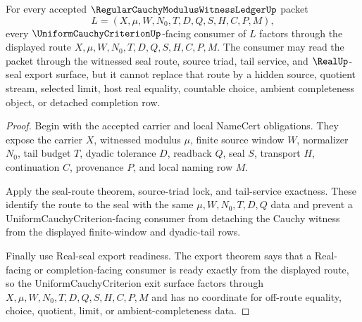\begin{theorem}
\label{thm:regular-cauchy-modulus-witness-ledger-uniform-exit-factor}
For every accepted $\RegularCauchyModulusWitnessLedgerUp$ packet
$$
L=(X,\mu,W,N_0,T,D,Q,S,H,C,P,M),
$$
every $\UniformCauchyCriterionUp$-facing consumer of $L$ factors through the displayed route $X,\mu,W,N_0,T,D,Q,S,H,C,P,M$. The consumer may read the packet through the witnessed seal route, source triad, tail service, and $\RealUp$-seal export surface, but it cannot replace that route by a hidden source, quotient stream, selected limit, host real equality, countable choice, ambient completeness object, or detached completion row.
\end{theorem}
\begin{proof}
Begin with the accepted carrier and local NameCert obligations. They expose the carrier $X$, witnessed modulus $\mu$, finite source window $W$, normalizer $N_0$, tail budget $T$, dyadic tolerance $D$, readback $Q$, seal $S$, transport $H$, continuation $C$, provenance $P$, and local naming row $M$.

Apply the seal-route theorem, source-triad lock, and tail-service exactness. These identify the route to the seal with the same $\mu,W,N_0,T,D,Q$ data and prevent a UniformCauchyCriterion-facing consumer from detaching the Cauchy witness from the displayed finite-window and dyadic-tail rows.

Finally use Real-seal export readiness. The export theorem says that a Real-facing or completion-facing consumer is ready exactly from the displayed route, so the UniformCauchyCriterion exit surface factors through $X,\mu,W,N_0,T,D,Q,S,H,C,P,M$ and has no coordinate for off-route equality, choice, quotient, limit, or ambient-completeness data.
\end{proof}

